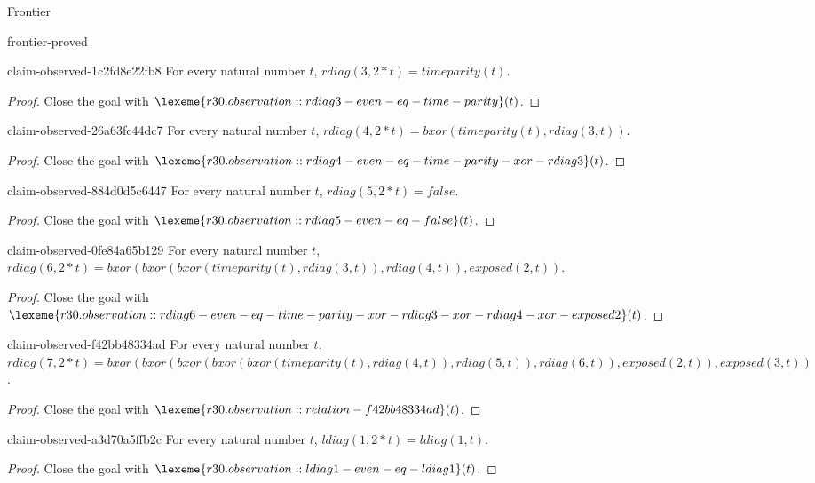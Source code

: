 \begin{lexlean}{Frontier}
\begin{section}{frontier-proved}
\begin{theorem}{claim-observed-1c2fd8e22fb8}
For every natural number \(t\), \(rdiag(3, 2 * t) = timeparity(t)\).
\begin{proof}
Close the goal with \(\lexeme{r30.observation::rdiag3-even-eq-time-parity}(t)\).
\end{proof}
\end{theorem}

\begin{theorem}{claim-observed-26a63fc44dc7}
For every natural number \(t\), \(rdiag(4, 2 * t) = bxor(timeparity(t), rdiag(3, t))\).
\begin{proof}
Close the goal with \(\lexeme{r30.observation::rdiag4-even-eq-time-parity-xor-rdiag3}(t)\).
\end{proof}
\end{theorem}

\begin{theorem}{claim-observed-884d0d5c6447}
For every natural number \(t\), \(rdiag(5, 2 * t) = false\).
\begin{proof}
Close the goal with \(\lexeme{r30.observation::rdiag5-even-eq-false}(t)\).
\end{proof}
\end{theorem}

\begin{theorem}{claim-observed-0fe84a65b129}
For every natural number \(t\), \(rdiag(6, 2 * t) = bxor(bxor(bxor(timeparity(t), rdiag(3, t)), rdiag(4, t)), exposed(2, t))\).
\begin{proof}
Close the goal with \(\lexeme{r30.observation::rdiag6-even-eq-time-parity-xor-rdiag3-xor-rdiag4-xor-exposed2}(t)\).
\end{proof}
\end{theorem}

\begin{theorem}{claim-observed-f42bb48334ad}
For every natural number \(t\), \(rdiag(7, 2 * t) = bxor(bxor(bxor(bxor(bxor(timeparity(t), rdiag(4, t)), rdiag(5, t)), rdiag(6, t)), exposed(2, t)), exposed(3, t))\).
\begin{proof}
Close the goal with \(\lexeme{r30.observation::relation-f42bb48334ad}(t)\).
\end{proof}
\end{theorem}

\begin{theorem}{claim-observed-a3d70a5ffb2c}
For every natural number \(t\), \(ldiag(1, 2 * t) = ldiag(1, t)\).
\begin{proof}
Close the goal with \(\lexeme{r30.observation::ldiag1-even-eq-ldiag1}(t)\).
\end{proof}
\end{theorem}


\end{section}
\end{lexlean}
